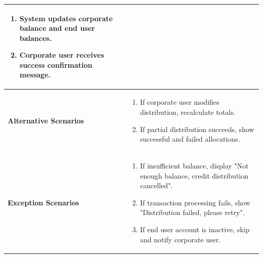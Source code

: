 \begin{longtable}{|p{}|p{}|}
\begin{enumerate}[nosep,leftmargin=*]
      \item System updates corporate balance and end user balances.
      \item Corporate user receives success confirmation message.
    \end{enumerate} \\ \hline
  \textbf{Alternative Scenarios} &
    \begin{enumerate}[nosep,leftmargin=*]
      \item If corporate user modifies distribution, recalculate totals.
      \item If partial distribution succeeds, show successful and failed allocations.
    \end{enumerate} \\ \hline
  \textbf{Exception Scenarios} &
    \begin{enumerate}[nosep,leftmargin=*]
      \item If insufficient balance, display "Not enough balance, credit distribution cancelled".
      \item If transaction processing fails, show "Distribution failed, please retry".
      \item If end user account is inactive, skip and notify corporate user.
    \end{enumerate} \\ \hline

\end{longtable}

\vspace{3cm}

